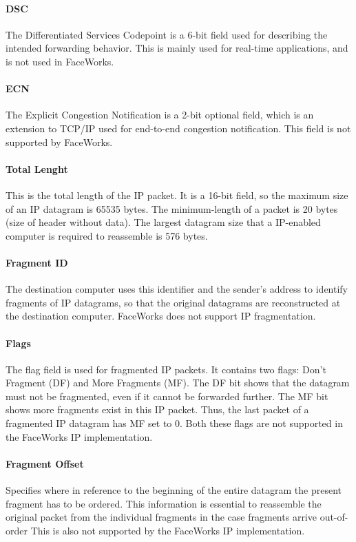 \documentclass[defaultstyle,10pt,master,Helvetica]{thesis}
\begin{document}
\paragraph*{DSC} The Differentiated Services Codepoint is a 6-bit field used for describing the intended forwarding behavior. This is mainly used for real-time applications, and is not used in FaceWorks.
\paragraph*{ECN} The Explicit Congestion Notification is a 2-bit optional field, which is an extension to \acs{TCP}/\ac{IP} used for end-to-end congestion notification. This field is not supported by FaceWorks.
\paragraph*{Total Lenght} This is the total length of the \ac{IP} packet. It is a 16-bit field, so the maximum size of an \ac{IP} datagram is 65535 bytes. The minimum-length of a packet is 20 bytes (size of header without data). The largest datagram size that a IP-enabled computer is required to reassemble is 576 bytes.
\paragraph*{Fragment ID} The destination computer uses this identifier and the sender's address to identify fragments of \ac{IP} datagrams, so that the original datagrams are reconstructed at the destination computer. FaceWorks does not support \ac{IP} fragmentation.
\paragraph*{Flags} The flag field is used for fragmented \ac{IP} packets. It contains two flags: Don't Fragment (DF) and More Fragments (MF). The DF bit shows that the datagram must not be fragmented, even if it cannot be forwarded further. The MF bit shows more fragments exist in this \ac{IP} packet. Thus, the last packet of a fragmented \ac{IP} datagram has MF set to 0. Both these flags are not supported in the FaceWorks \ac{IP} implementation.
\paragraph*{Fragment Offset} Specifies where in reference to the beginning of the entire datagram the present fragment has to be ordered. This information is essential to reassemble the original packet from the individual fragments in the case fragments arrive out-of-order This is also not supported by the FaceWorks \ac{IP} implementation.
\end{document}
